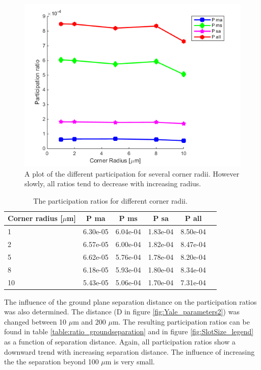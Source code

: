  \begin{figure}
 	\centering
 	\includegraphics[scale = 0.7]{Figures/Ratio_plots/CornerRadius_legend}
 	\caption{A plot of the different participation for several corner radii. However slowly, all ratios tend to decrease with increasing radius.}
 	\label{fig:CornerRadius}
 \end{figure}

\begin{table}
	\begin{center}
		\begin{tabular}{ | l || c | c | c | c | c |}
			\hline
			Corner radius [\(\mu\)m] & P ma & P ms & P sa & P all \\ \hline
			1 & 6.30e-05 & 6.04e-04 & 1.83e-04 & 8.50e-04 \\
			2 & 6.57e-05 & 6.00e-04 & 1.82e-04 & 8.47e-04 \\
			5 & 6.62e-05 & 5.76e-04 & 1.78e-04 & 8.20e-04\\
			8 & 6.18e-05 & 5.93e-04 & 1.80e-04 & 8.34e-04\\
			10 & 5.43e-05 & 5.06e-04 & 1.70e-04 & 7.31e-04\\
			\hline
		\end{tabular}
	\end{center}
	\caption{The participation ratios for different corner radii.}
	\label{table:ratio_cornerradius}
\end{table}

The influence of the ground plane separation distance on the participation ratios was also determined. The distance (D in figure \ref{fig:Yale_parameters2}) was changed between 10 \(\mu\)m and 200 \(\mu\)m. The resulting participation ratios can be found in table \ref{table:ratio_groundseparation} and in figure \ref{fig:SlotSize_legend} as a function of separation distance. Again, all participation ratios show a downward trend with increasing separation distance. The influence of increasing the the separation beyond 100 \(\mu\)m is very small.

